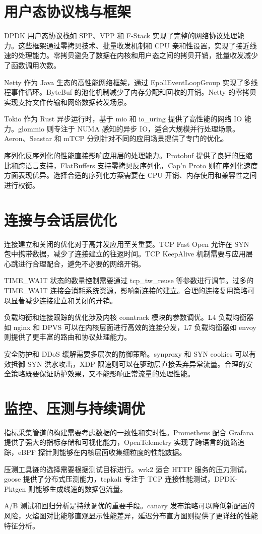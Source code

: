 \chapter{用户态协议栈与框架}
DPDK 用户态协议栈如 SPP、VPP 和 F-Stack 实现了完整的网络协议处理能力。这些框架通过零拷贝技术、批量收发机制和 CPU 亲和性设置，实现了接近线速的处理能力。零拷贝避免了数据在内核和用户态之间的拷贝开销，批量收发减少了函数调用次数。\par
Netty 作为 Java 生态的高性能网络框架，通过 EpollEventLoopGroup 实现了多线程事件循环。ByteBuf 的池化机制减少了内存分配和回收的开销。Netty 的零拷贝实现支持文件传输和网络数据转发场景。\par
Tokio 作为 Rust 异步运行时，基于 mio 和 io\_{}uring 提供了高性能的网络 IO 能力。glommio 则专注于 NUMA 感知的异步 IO，适合大规模并行处理场景。Aeron、Seastar 和 mTCP 分别针对不同的应用场景提供了专门的优化。\par
序列化反序列化的性能直接影响应用层的处理能力。Protobuf 提供了良好的压缩比和跨语言支持，FlatBuffers 支持零拷贝反序列化，Cap'n Proto 则在序列化速度方面表现优异。选择合适的序列化方案需要在 CPU 开销、内存使用和兼容性之间进行权衡。\par
\chapter{连接与会话层优化}
连接建立和关闭的优化对于高并发应用至关重要。TCP Fast Open 允许在 SYN 包中携带数据，减少了连接建立的往返时间。TCP KeepAlive 机制需要与应用层心跳进行合理配合，避免不必要的网络开销。\par
TIME\_{}WAIT 状态的数量控制需要通过 tcp\_{}tw\_{}reuse 等参数进行调节。过多的 TIME\_{}WAIT 连接会消耗系统资源，影响新连接的建立。合理的连接复用策略可以显著减少连接建立和关闭的开销。\par
负载均衡和连接跟踪的优化涉及内核 conntrack 模块的参数调优。L4 负载均衡器如 nginx 和 DPVS 可以在内核层面进行高效的连接分发，L7 负载均衡器如 envoy 则提供了更丰富的路由和协议处理能力。\par
安全防护和 DDoS 缓解需要多层次的防御策略。synproxy 和 SYN cookies 可以有效抵御 SYN 洪水攻击，XDP 限速则可以在驱动层直接丢弃异常流量。合理的安全策略既要保证防护效果，又不能影响正常流量的处理性能。\par
\chapter{监控、压测与持续调优}
指标采集管道的构建需要考虑数据的一致性和实时性。Prometheus 配合 Grafana 提供了强大的指标存储和可视化能力，OpenTelemetry 实现了跨语言的链路追踪，eBPF 探针则能够在内核层面收集细粒度的性能数据。\par
压测工具链的选择需要根据测试目标进行。wrk2 适合 HTTP 服务的压力测试，goose 提供了分布式压测能力，tcpkali 专注于 TCP 连接性能测试，DPDK-Pktgen 则能够生成线速的数据包流量。\par
A/B 测试和回归分析是持续调优的重要手段。canary 发布策略可以降低新配置的风险，火焰图对比能够直观显示性能差异，延迟分布直方图则提供了更详细的性能特征分析。\par

